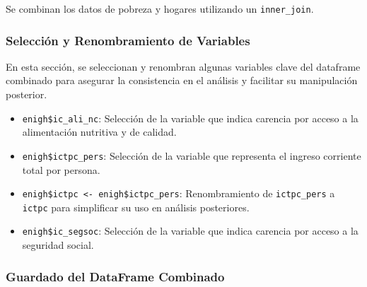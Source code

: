 \documentclass[
  12pt,
]{book}
\newenvironment{Shaded}{\begin{snugshade}}{\end{snugshade}}
\newcommand{\NormalTok}[1]{#1}
\newcommand{\OtherTok}[1]{\textcolor[rgb]{0.56,0.35,0.01}{#1}}
\newcommand{\SpecialCharTok}[1]{\textcolor[rgb]{0.81,0.36,0.00}{\textbf{#1}}}
\providecommand{\tightlist}{%
  \setlength{\itemsep}{0pt}\setlength{\parskip}{0pt}}
\begin{document}
Se combinan los datos de pobreza y hogares utilizando un \texttt{inner\_join}.

\hypertarget{selecciuxf3n-y-renombramiento-de-variables}{%
\subsubsection*{Selección y Renombramiento de Variables}\label{selecciuxf3n-y-renombramiento-de-variables}}

En esta sección, se seleccionan y renombran algunas variables clave del dataframe combinado para asegurar la consistencia en el análisis y facilitar su manipulación posterior.

\begin{Shaded}
\end{Shaded}

\begin{itemize}
\tightlist
\item
  \texttt{enigh\$ic\_ali\_nc}: Selección de la variable que indica carencia por acceso a la alimentación nutritiva y de calidad.
\item
  \texttt{enigh\$ictpc\_pers}: Selección de la variable que representa el ingreso corriente total por persona.
\item
  \texttt{enigh\$ictpc\ \textless{}-\ enigh\$ictpc\_pers}: Renombramiento de \texttt{ictpc\_pers} a \texttt{ictpc} para simplificar su uso en análisis posteriores.
\item
  \texttt{enigh\$ic\_segsoc}: Selección de la variable que indica carencia por acceso a la seguridad social.
\end{itemize}

\hypertarget{guardado-del-dataframe-combinado}{%
\subsubsection*{Guardado del DataFrame Combinado}\label{guardado-del-dataframe-combinado}}
\end{document}
